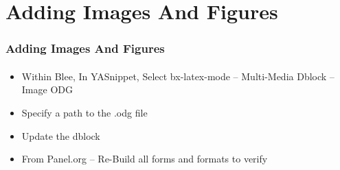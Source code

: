 \begin{comment}
*  [[elisp:(org-cycle)][| ]] [[elisp:(org-show-subtree)][|=]] [[elisp:(show-children 10)][|V]] [[elisp:(bx:orgm:indirectBufOther)][|>]] [[elisp:(bx:orgm:indirectBufMain)][|I]] [[elisp:(blee:ppmm:org-mode-toggle)][|N]] [[elisp:(org-top-overview)][|O]] [[elisp:(progn (org-shifttab) (org-content))][|C]] [[elisp:(delete-other-windows)][|1]]  /Section/   Adding Images And Figures ::  [[elisp:(org-cycle)][| ]]
\end{comment}

\section{Adding Images And Figures}



\begin{comment}
*****  [[elisp:(org-cycle)][| ]]  [[elisp:(blee:ppmm:org-mode-toggle)][Nat]] [[elisp:(beginning-of-buffer)][Top]] [[elisp:(delete-other-windows)][(1)]] || /Frame/ *Label=AddingImagesAndFigures*  Adding Images And Figures ::  [[elisp:(org-cycle)][| ]]
\end{comment}

\begin{frame}[fragile,label=AddingImagesAndFigures]
    \frametitle{Adding Images And Figures}
    \framesubtitle{}

\begin{itemize}
\item Within Blee, In YASnippet, Select bx-latex-mode -- Multi-Media Dblock -- Image ODG
\item Specify a path to the .odg file
\item Update the dblock
\item From Panel.org -- Re-Build all forms and formats to verify
\end{itemize}



\end{frame}
  





